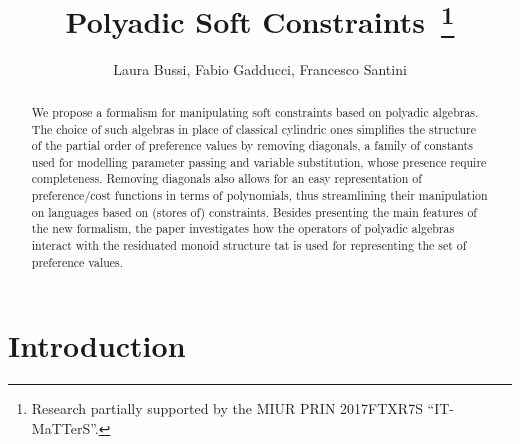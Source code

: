 \documentclass{llncs}
\begin{document}
\title{Polyadic Soft Constraints~\thanks{Research partially supported by the MIUR PRIN 2017FTXR7S ``IT-MaTTerS''.}}


\author{Laura Bussi, Fabio Gadducci, 
Francesco Santini
} 
	

\maketitle

\begin{abstract}
We propose a formalism for manipulating soft constraints based on polyadic algebras.
%
The choice of such algebras in place of classical cylindric ones
 simplifies the structure of the partial order of preference values by removing diagonals, 
 a family of constants used for modelling parameter passing and variable substitution,
 whose presence require completeness. 
 Removing diagonals also allows for an easy representation of preference/cost functions in terms of polynomials,
 thus streamlining their manipulation on languages based on (stores of) constraints.
%
Besides presenting the main features of the new formalism,
the paper investigates how the operators of polyadic algebras interact with the residuated 
monoid structure tat is used for representing the set of preference values. 

%
\end{abstract}


\section{Introduction}\label{sec:intro}
\end{document}
